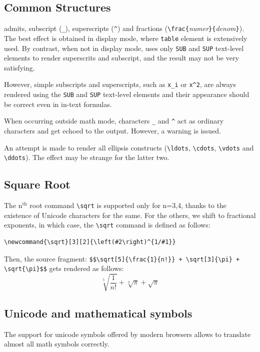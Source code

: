 \subsection{Common Structures}

\hevea{} admits, subscript (\verb+_+), superscripts (\verb+^+) and
fractions (\verb+\frac{+{\it numer}\verb+}{+{\it denom}\verb+}+).
The best effect is obtained in display mode, where \html{}
\verb+table+ element is extensively used.
By contrast, when not in display mode, \hevea{} uses only
\verb+SUB+ and \verb+SUP+ text-level elements to render superscrits
and subscript, and the result may not be very satisfying.

However,
simple subscripts and superscripts, such as \verb+x_i+ or \verb+x^2+,
are always rendered using the \verb+SUB+
and \verb+SUP+ text-level elements and their appearance should be correct
even in in-text formulas.

When occurring outside math mode, characters \verb+_+ and \verb+^+ act as
ordinary characters and get echoed to the output. However, a warning
is issued.

An attempt is made to render all ellipsis constructs (\verb+\ldots+,
\verb+\cdots+, \verb+\vdots+ and \verb+\ddots+). The effect may be
strange for the latter two.

\subsection{Square Root}
\index{\verb+\sqrt+}
The n$^{\mbox{th}}$ root command \verb+\sqrt+ is supported only for n=3,4, thanks to the existence of Unicode characters for the same. For the others, we shift to fractional exponents, in which case, the \verb+\sqrt+ command is
defined as follows:
\begin{verbatim}
\newcommand{\sqrt}[3][2]{\left(#2\right)^{1/#1}}
\end{verbatim}
\begin{htmlonly}
Then, the source
fragment: \verb"$$\sqrt[5]{\frac{1}{n!}} + \sqrt[3]{\pi} + \sqrt{\pi}$$" gets rendered
as follows:
$$
\sqrt[5]{\frac{1}{n!}} + \sqrt[3]{\pi} + \sqrt{\pi}
$$
\end{htmlonly}

\subsection{Unicode and mathematical symbols}

The support for unicode symbols offered by modern browsers allows to
translate almost all math symbols correctly.

